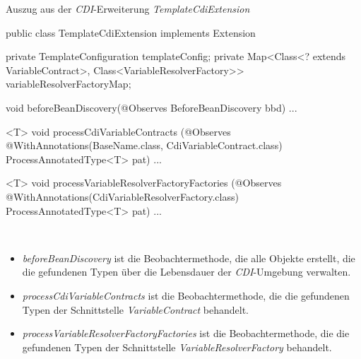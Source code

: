 \begin{program}[h]
\caption{Auszug aus der \emph{CDI}-Erweiterung \emph{TemplateCdiExtension}}
\label{prog:templateCdiExtension}
\begin{JavaCode}
public class TemplateCdiExtension implements Extension {

    private TemplateConfiguration templateConfig;
    private Map<Class<? extends VariableContract>, 
                Class<VariableResolverFactory>>  
            variableResolverFactoryMap;

    void beforeBeanDiscovery(@Observes BeforeBeanDiscovery bbd) { ... }

    <T> void processCdiVariableContracts
             (@Observes @WithAnnotations({BaseName.class, 
                                          CdiVariableContract.class}) 
             ProcessAnnotatedType<T> pat) { ... }

    <T> void processVariableResolverFactoryFactories
        (@Observes @WithAnnotations(CdiVariableResolverFactory.class) 
        ProcessAnnotatedType<T> pat) { ... }
}
\end{JavaCode}
\end{program}
\ \newpage
\begin{itemize}
	\item\emph{beforeBeanDiscovery} 
	\newline
	ist die Beobachtermethode, die alle Objekte erstellt, die die gefundenen Typen über die Lebensdauer der \emph{CDI}-Umgebung verwalten.
	\item\emph{processCdiVariableContracts} 
	\newline
	ist die Beobachtermethode, die die gefundenen Typen der Schnittstelle \emph{VariableContract} behandelt.
	\item\emph{processVariableResolverFactoryFactories} 
	\newline
	ist die Beobachtermethode, die die gefundenen Typen der Schnittstelle \emph{VariableResolverFactory} behandelt.
\end{itemize}

